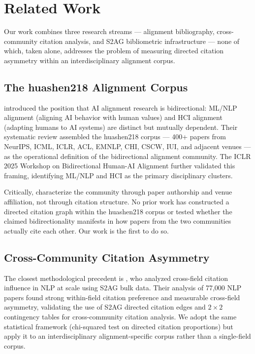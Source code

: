 \section{Related Work}
\label{sec:related}

Our work combines three research streams --- alignment bibliography, cross-community citation analysis, and S2AG bibliometric infrastructure --- none of which, taken alone, addresses the problem of measuring directed citation asymmetry within an interdisciplinary alignment corpus.

\subsection{The huashen218 Alignment Corpus}

\citet{Shen2024Position} introduced the position that AI alignment research is bidirectional: ML/NLP alignment (aligning AI behavior with human values) and HCI alignment (adapting humans to AI systems) are distinct but mutually dependent.
Their systematic review assembled the huashen218 corpus --- 400+ papers from NeurIPS, ICML, ICLR, ACL, EMNLP, CHI, CSCW, IUI, and adjacent venues --- as the operational definition of the bidirectional alignment community.
The ICLR 2025 Workshop on Bidirectional Human-AI Alignment further validated this framing, identifying ML/NLP and HCI as the primary disciplinary clusters.

Critically, \citet{Shen2024Position} characterize the community through paper authorship and venue affiliation, not through citation structure.
No prior work has constructed a directed citation graph within the huashen218 corpus or tested whether the claimed bidirectionality manifests in how papers from the two communities actually cite each other.
Our work is the first to do so.

\subsection{Cross-Community Citation Asymmetry}

The closest methodological precedent is \citet{Wahle2023WhoWeCite}, who analyzed cross-field citation influence in NLP at scale using S2AG bulk data.
Their analysis of 77,000 NLP papers found strong within-field citation preference and measurable cross-field asymmetry, validating the use of S2AG directed citation edges and $2\times2$ contingency tables for cross-community citation analysis.
We adopt the same statistical framework (chi-squared test on directed citation proportions) but apply it to an interdisciplinary alignment-specific corpus rather than a single-field corpus.

